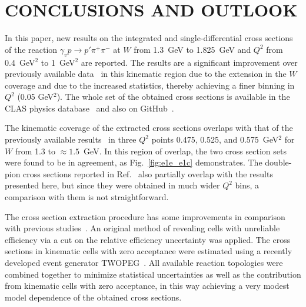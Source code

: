 \documentclass[prc,twocolumn,superscriptaddress,showpacs,amssymb,amsmath,amsfonts,aps,nofootinbib]{revtex4-1}
\begin{document}
\section{CONCLUSIONS AND OUTLOOK}

In this paper, new results on the integrated and single-differential cross sections of the reaction $\gamma_{v} p \rightarrow p' \pi^{+} \pi^{-}$  at $W$ from 1.3~GeV to 1.825~GeV and $Q^{2}$ from 0.4~GeV$^{2}$ to 1~GeV$^{2}$ are reported. The results are a significant improvement over previously available data~\cite{Fedotov:2008aa,Ripani:2002ss} in this kinematic region due to the extension in the $W$ coverage and due to the increased statistics, thereby achieving a finer binning in $Q^2$ (0.05 GeV$^2$). The whole set of the obtained cross sections is available in the CLAS physics database~\cite{CLAS_DB} and also on GitHub~\cite{Github:data}.

 
The kinematic coverage of the extracted cross sections overlaps with that of the previously available results~\cite{Fedotov:2008aa} in three $Q^{2}$ points 0.475, 0.525, and 0.575~GeV$^2$ for $W$ from 1.3 to $\approx 1.5$~GeV. In this region of overlap, the two cross section sets were found to be in agreement, as Fig.~\ref{fig:e1e_e1c} demonstrates. 
The double-pion cross sections reported in Ref.~\cite{Ripani:2002ss} also partially overlap with the results presented here, but since they were obtained  in much wider $Q^{2}$ bins, a comparison with them is not straightforward.

The cross section extraction procedure has some improvements in comparison with previous studies~\cite{Fedotov:2008aa,Ripani:2002ss,Isupov:2017lnd}.  An original method of revealing cells with unreliable efficiency via a cut on the relative efficiency uncertainty was applied. The cross sections in kinematic cells with zero acceptance were estimated using a recently developed event generator TWOPEG~\cite{Skorodum:EG}. All available reaction topologies were combined together to minimize statistical uncertainties as well as the contribution from kinematic cells with zero acceptance, in this way achieving a very modest model dependence of the obtained cross sections.

\end{document}
